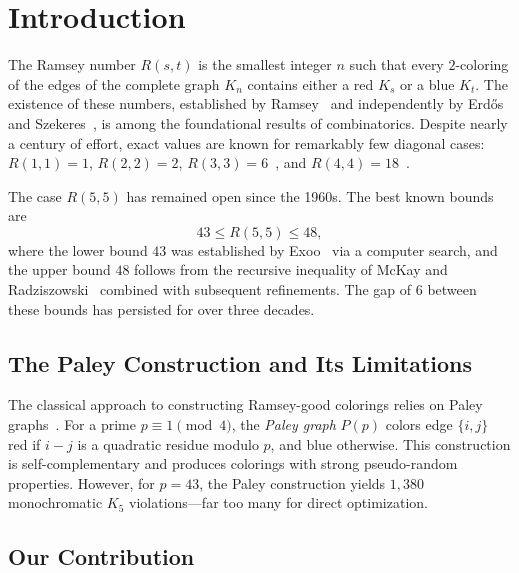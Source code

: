 \documentclass[12pt,a4paper]{article}
\theoremstyle{definition}
\theoremstyle{remark}
\newcommand{\Kn}[1]{K_{#1}}
\newcommand{\Rnum}[2]{R(#1,#2)}
\begin{document}
\newpage
\tableofcontents
\newpage


\section{Introduction}\label{sec:intro}

The Ramsey number $\Rnum{s}{t}$ is the smallest integer $n$ such that every $2$-coloring of the edges of the complete graph $\Kn{n}$ contains either a red $K_s$ or a blue $K_t$.  The existence of these numbers, established by Ramsey~\cite{ramsey1930} and independently by Erd\H{o}s and Szekeres~\cite{erdos1935}, is among the foundational results of combinatorics.  Despite nearly a century of effort, exact values are known for remarkably few diagonal cases: $\Rnum{1}{1} = 1$, $\Rnum{2}{2} = 2$, $\Rnum{3}{3} = 6$~\cite{greenwood1955}, and $\Rnum{4}{4} = 18$~\cite{greenwood1955}.

The case $\Rnum{5}{5}$ has remained open since the 1960s.  The best known bounds are
\begin{equation}\label{eq:R55bounds}
    43 \le \Rnum{5}{5} \le 48,
\end{equation}
where the lower bound $43$ was established by Exoo~\cite{exoo1989} via a computer search, and the upper bound $48$ follows from the recursive inequality of McKay and Radziszowski~\cite{mckay1995} combined with subsequent refinements.  The gap of $6$ between these bounds has persisted for over three decades.

\subsection{The Paley Construction and Its Limitations}

The classical approach to constructing Ramsey-good colorings relies on Paley graphs~\cite{paley1933}.  For a prime $p \equiv 1 \pmod{4}$, the \emph{Paley graph} $P(p)$ colors edge $\{i,j\}$ red if $i - j$ is a quadratic residue modulo $p$, and blue otherwise.  This construction is self-complementary and produces colorings with strong pseudo-random properties.  However, for $p = 43$, the Paley construction yields $1{,}380$ monochromatic $K_5$ violations---far too many for direct optimization.

\subsection{Our Contribution}
\end{document}
